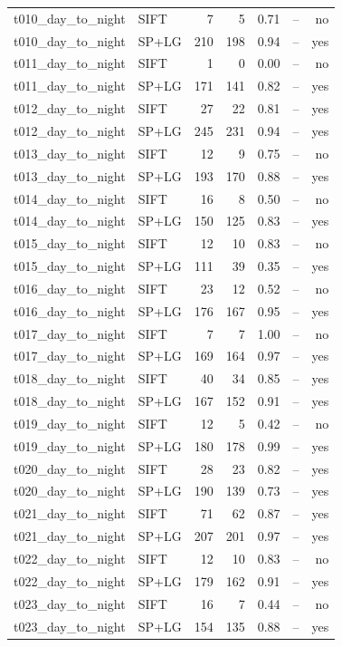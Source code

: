 \begin{longtable}{llrrrrr}
t010\_day\_to\_night & SIFT & 7 & 5 & 0.71 & -- & no \\
t010\_day\_to\_night & SP+LG & 210 & 198 & 0.94 & -- & yes \\
t011\_day\_to\_night & SIFT & 1 & 0 & 0.00 & -- & no \\
t011\_day\_to\_night & SP+LG & 171 & 141 & 0.82 & -- & yes \\
t012\_day\_to\_night & SIFT & 27 & 22 & 0.81 & -- & yes \\
t012\_day\_to\_night & SP+LG & 245 & 231 & 0.94 & -- & yes \\
t013\_day\_to\_night & SIFT & 12 & 9 & 0.75 & -- & no \\
t013\_day\_to\_night & SP+LG & 193 & 170 & 0.88 & -- & yes \\
t014\_day\_to\_night & SIFT & 16 & 8 & 0.50 & -- & no \\
t014\_day\_to\_night & SP+LG & 150 & 125 & 0.83 & -- & yes \\
t015\_day\_to\_night & SIFT & 12 & 10 & 0.83 & -- & no \\
t015\_day\_to\_night & SP+LG & 111 & 39 & 0.35 & -- & yes \\
t016\_day\_to\_night & SIFT & 23 & 12 & 0.52 & -- & no \\
t016\_day\_to\_night & SP+LG & 176 & 167 & 0.95 & -- & yes \\
t017\_day\_to\_night & SIFT & 7 & 7 & 1.00 & -- & no \\
t017\_day\_to\_night & SP+LG & 169 & 164 & 0.97 & -- & yes \\
t018\_day\_to\_night & SIFT & 40 & 34 & 0.85 & -- & yes \\
t018\_day\_to\_night & SP+LG & 167 & 152 & 0.91 & -- & yes \\
t019\_day\_to\_night & SIFT & 12 & 5 & 0.42 & -- & no \\
t019\_day\_to\_night & SP+LG & 180 & 178 & 0.99 & -- & yes \\
t020\_day\_to\_night & SIFT & 28 & 23 & 0.82 & -- & yes \\
t020\_day\_to\_night & SP+LG & 190 & 139 & 0.73 & -- & yes \\
t021\_day\_to\_night & SIFT & 71 & 62 & 0.87 & -- & yes \\
t021\_day\_to\_night & SP+LG & 207 & 201 & 0.97 & -- & yes \\
t022\_day\_to\_night & SIFT & 12 & 10 & 0.83 & -- & no \\
t022\_day\_to\_night & SP+LG & 179 & 162 & 0.91 & -- & yes \\
t023\_day\_to\_night & SIFT & 16 & 7 & 0.44 & -- & no \\
t023\_day\_to\_night & SP+LG & 154 & 135 & 0.88 & -- & yes \\
\end{longtable}\endgroup
